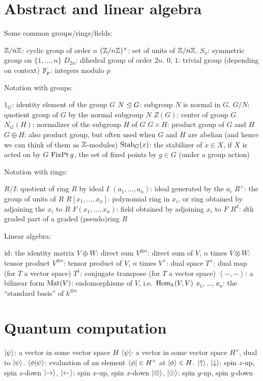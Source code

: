 \section{Abstract and linear algebra}
Some common groups/rings/fields:
\begin{itemize}
	\ii $\mathbb Z/n\mathbb Z$: cyclic group of order $n$
	\ii $(\mathbb Z/n\mathbb Z)^\times$: set of units of $\mathbb Z/n\mathbb Z$.
	\ii $S_n$: symmetric group on $\{1, \dots, n\}$
	\ii $D_{2n}$: dihedral group of order $2n$.
	\ii $0$, $1$: trivial group (depending on context)
	\ii $\mathbb F_p$: integers modulo $p$
\end{itemize}
Notation with groups:
\begin{itemize}
	\ii $1_G$: identity element of the group $G$
	\ii $N \trianglelefteq G$: subgroup $N$ is normal in $G$.
	\ii $G/N$: quotient group of $G$ by the normal subgroup $N$
	\ii $Z(G)$: center of group $G$
	\ii $N_G(H)$: normalizer of the subgroup $H$ of $G$
	\ii $G \times H$: product group of $G$ and $H$
	\ii $G \oplus H$: also product group,
	but often used when $G$ and $H$ are abelian
	(and hence we can think of them as $\mathbb Z$-modules)
	\ii $\operatorname{Stab}_G(x)$: the stabilizer of $x \in X$, if $X$ is acted on by $G$
	\ii $\operatorname{FixPt} g$, the set of fixed points by $g \in G$ (under a group action)
\end{itemize}
Notation with rings:
\begin{itemize}
	\ii $R/I$: quotient of ring $R$ by ideal $I$
	\ii $(a_1, \dots, a_n)$: ideal generated by the $a_i$
	\ii $R^\times$: the group of units of $R$
	\ii $R[x_1, \dots, x_n]$: polynomial ring in $x_i$,
	or ring obtained by adjoining the $x_i$ to $R$
	\ii $F(x_1, \dots, x_n)$: field obtained by adjoining $x_i$ to $F$
	\ii $R^d$: $d$th graded part of a graded (pseudo)ring $R$
\end{itemize}
Linear algebra:
\begin{itemize}
	\ii $\mathrm{id}$: the identity matrix
	\ii $V \oplus W$: direct sum
	\ii $V^{\oplus n}$: direct sum of $V$, $n$ times
	\ii $V \otimes W$: tensor product
	\ii $V^{\otimes n}$: tensor product of $V$, $n$ times
	\ii $V^\vee$: dual space
	\ii $T^\vee$: dual map (for $T$ a vector space)
	\ii $T^\dagger$: conjugate transpose (for $T$ a vector space)
	\ii $\left< -,-\right>$: a bilinear form
	\ii $\mathrm{Mat}(V)$: endomorphisms of $V$, i.e.\ $\operatorname{Hom}_k(V,V)$
	\ii $\ee_1$, \dots, $\ee_n$: the ``standard basis'' of $k^{\oplus n}$
\end{itemize}
\section{Quantum computation}
\begin{itemize}
	\ii $\ket{\psi}$: a vector in some vector space $H$
	\ii $\bra{\psi}$: a vector in some vector space $H^\vee$, dual to $\ket{\psi}$.
	\ii $\braket{\phi|\psi}$: evaluation of an element $\bra{\phi} \in H^\vee$ at $\ket{\phi} \in H$.
	\ii $\ket\uparrow$, $\ket\downarrow$: spin $z$-up, spin $z$-down
	\ii $\ket\rightarrow$, $\ket\leftarrow$: spin $x$-up, spin $x$-down
	\ii $\ket\otimes$, $\ket\odot$: spin $y$-up, spin $y$-down
\end{itemize}

